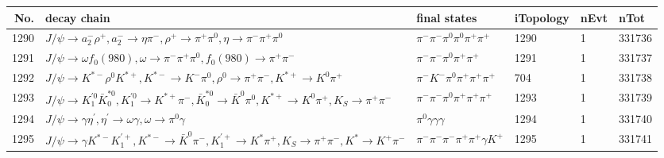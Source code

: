 \begin{table}[htbp] 
\begin{center}
\begin{small}
\begin{tabular}{rlllll}\hline\hline
 No. & decay chain & final states &  iTopology & nEvt & nTot \\\hline
1290&$J/\psi       \rightarrow a_{2}^{-}      \rho^{+}      , a_{2}^{-}       \rightarrow \eta          \pi^{-}        , \rho^{+}       \rightarrow \pi^{+}        \pi^{0}        , \eta           \rightarrow \pi^{-}        \pi^{+}        \pi^{0}        $&$\pi^{-}        \pi^{-}        \pi^{0}        \pi^{0}        \pi^{+}        \pi^{+}        $& 1290&    1&331736\\
1291&$J/\psi       \rightarrow \omega         f_{0}(980)     , \omega          \rightarrow \pi^{-}        \pi^{+}        \pi^{0}        , f_{0}(980)      \rightarrow \pi^{+}        \pi^{-}        $&$\pi^{-}        \pi^{-}        \pi^{0}        \pi^{+}        \pi^{+}        $& 1291&    1&331737\\
1292&$J/\psi       \rightarrow K^{*-}         \rho^{0}      K^{*+}         , K^{*-}          \rightarrow K^{-}          \pi^{0}        , \rho^{0}       \rightarrow \pi^{+}        \pi^{-}        , K^{*+}          \rightarrow K^{0}          \pi^{+}        $&$\pi^{-}        K^{-}          \pi^{0}        \pi^{+}        \pi^{+}        \pi^{+}        $&  704&    1&331738\\
1293&$J/\psi       \rightarrow K_1^{'0}      \bar{K}_0^{*0}, K_1^{'0}       \rightarrow K^{*+}         \pi^{-}        , \bar{K}_0^{*0} \rightarrow \bar{K}^{0}   \pi^{0}        , K^{*+}          \rightarrow K^{0}          \pi^{+}        , K_{S}           \rightarrow \pi^{+}        \pi^{-}        $&$\pi^{-}        \pi^{-}        \pi^{0}        \pi^{+}        \pi^{+}        \pi^{+}        $& 1293&    1&331739\\
1294&$J/\psi       \rightarrow \gamma       \eta^{\prime} , \eta^{\prime}  \rightarrow \omega         \gamma       , \omega          \rightarrow \pi^{0}        \gamma       $&$\pi^{0}        \gamma       \gamma       \gamma       $& 1294&    1&331740\\
1295&$J/\psi       \rightarrow \gamma       K^{*-}         K_1^{'+}      , K^{*-}          \rightarrow \bar{K}^{0}   \pi^{-}        , K_1^{'+}       \rightarrow K^{*}          \pi^{+}        , K_{S}           \rightarrow \pi^{+}        \pi^{-}        , K^{*}           \rightarrow K^{+}          \pi^{-}        $&$\pi^{-}        \pi^{-}        \pi^{-}        \pi^{+}        \pi^{+}        \gamma       K^{+}          $& 1295&    1&331741\\

\end{tabular}
\end{small}
\end{center}
\end{table}
